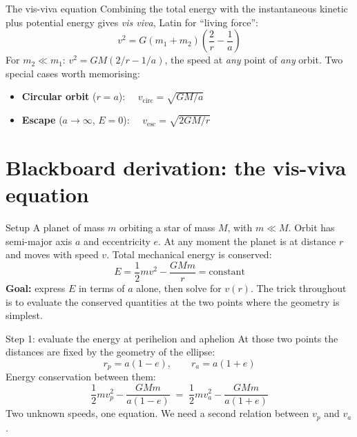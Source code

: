 \documentclass[aspectratio=169, 11pt]{beamer}
\begin{document}
\begin{frame}{The vis-viva equation}
  Combining the total energy with the instantaneous kinetic plus potential energy gives \emph{vis viva}, Latin for ``living force'':
  \vskip2pt\relax
  \[
    \boxed{\; v^2 = G(m_1 + m_2)\left(\frac{2}{r} - \frac{1}{a}\right) \;}
  \]
  \vskip4pt\relax
  For $m_2 \ll m_1$: $v^2 = GM\left(2/r - 1/a\right)$, the speed at \emph{any} point of \emph{any} orbit.
  \vskip4pt\relax
  Two special cases worth memorising:
  \begin{itemize}
    \item \textbf{Circular orbit} ($r = a$): $\quad v_{\mathrm{circ}} = \sqrt{GM/a}$
    \item \textbf{Escape} ($a \to \infty$, $E = 0$): $\quad v_{\mathrm{esc}} = \sqrt{2GM/r}$
  \end{itemize}
  \vskip2pt\relax
\end{frame}


\breakslide


\section{Blackboard derivation: the vis-viva equation}

\begin{frame}{Setup}
  A planet of mass $m$ orbiting a star of mass $M$, with $m \ll M$. Orbit has semi-major axis $a$ and eccentricity $e$. At any moment the planet is at distance $r$ and moves with speed $v$.
  \vskip8pt\relax
  Total mechanical energy is conserved:
  \[
    E = \frac{1}{2}mv^2 - \frac{GMm}{r} = \mathrm{constant}
  \]
  \vskip8pt\relax
  \textbf{Goal:} express $E$ in terms of $a$ alone, then solve for $v(r)$.
  \vskip6pt\relax
  The trick throughout is to evaluate the conserved quantities at the two points where the geometry is simplest.
\end{frame}

\begin{frame}{Step 1: evaluate the energy at perihelion and aphelion}
  At those two points the distances are fixed by the geometry of the ellipse:
  \[
    r_p = a(1 - e), \qquad r_a = a(1 + e)
  \]
  \vskip4pt\relax
  Energy conservation between them:
  \[
    \frac{1}{2}mv_p^2 - \frac{GMm}{a(1-e)} \;=\; \frac{1}{2}mv_a^2 - \frac{GMm}{a(1+e)}
  \]
  \vskip6pt\relax
  Two unknown speeds, one equation. We need a second relation between $v_p$ and $v_a$.
\end{frame}
\end{document}

